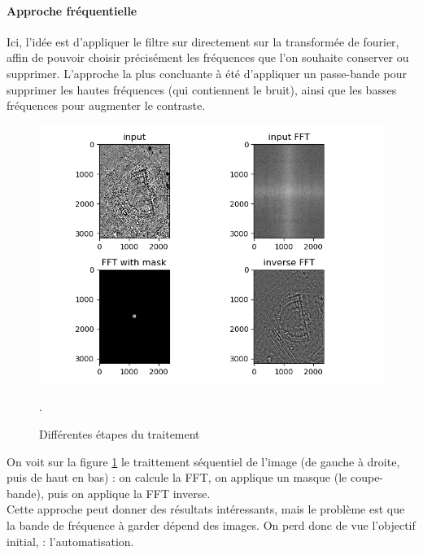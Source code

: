 \documentclass[a4paper, 12pt, titlepage, oneside, french]{article}
\begin{document}
	\pagebreak
	\paragraph{\textbf{Approche fréquentielle}}
	Ici, l'idée est d'appliquer le filtre sur directement sur la transformée de fourier, affin de pouvoir choisir précisément les fréquences que l'on souhaite conserver ou supprimer.
	L'approche la plus concluante à été d'appliquer un passe-bande pour supprimer les hautes fréquences (qui contiennent le bruit), ainsi que les basses fréquences pour augmenter le contraste.
	\begin{figure}[H]
		\centering
		\includegraphics[width=\linewidth]{filter_fft.png}
		\caption{Différentes étapes du traitement}. 
		\label{fig:FilterFFT}
	\end{figure}
	On voit sur la figure \ref{fig:FilterFFT} le traittement séquentiel de l'image (de gauche à droite, puis de haut en bas) : on calcule la FFT, on applique un masque (le coupe-bande), puis on applique la FFT inverse. \\
	Cette approche peut donner des résultats intéressants, mais le problème est que la bande de fréquence à garder dépend des images. On perd donc de vue l'objectif initial, : l'automatisation.

	\pagebreak
\end{document}
